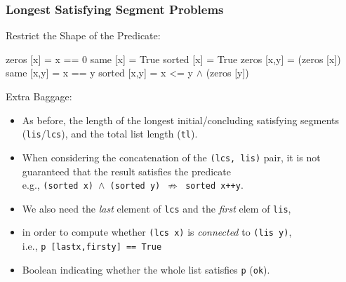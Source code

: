 \documentclass{beamer}
\newcommand{\emp}[1]{\textcolor{DikuRed}{ #1}}
\newcommand{\mymath}[1]{$ #1 $}
\begin{document}
\begin{frame}[fragile,t]
  \frametitle{Longest Satisfying Segment Problems}

\begin{block}{Restrict the Shape of the Predicate:}
\begin{colorcode}
zeros [x]   = x == 0           same [x]   = True     sorted [x]   = True
zeros [x,y] =  (zeros [x])     same [x,y] = x == y   sorted [x,y] = x <= y
             \mymath{\wedge} (zeros [y])
\end{colorcode}
\end{block} 

\bigskip
Extra Baggage:
\begin{itemize}
    \item As before, the \emp{length} of the longest initial/concluding  satisfying segments ({\tt lis}/{\tt lcs}),
            and the total list length ({\tt tl}).
    \item When considering the concatenation of the {\tt (lcs, lis)} pair, it is not guaranteed that the
            result satisfies the predicate \\
            e.g., {\tt (sorted x) $\wedge$ (sorted y) $\not\Rightarrow$ sorted x++y}.  
    \item We also need the {\em last} element of {\tt lcs} and the {\em first} elem of {\tt lis},
    \item in order to compute whether {\tt (lcs x)} is {\em connected} to {\tt (lis y)}, \\ i.e., {\tt p [lastx,firsty] == True}
    \item Boolean indicating whether the whole list satisfies {\tt p} ({\tt ok}).
\end{itemize}
\end{frame}
\end{document}
